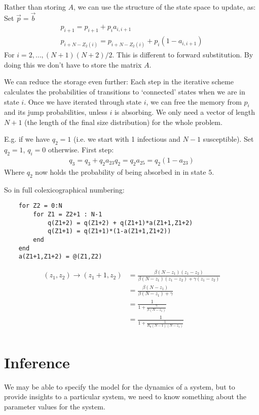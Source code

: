\documentclass{X:/Documents/Coding/Latex/myassignment}
\begin{document}
Rather than storing $A$, we can use the structure of the state space to update, as:
 Set $\vec p = \vec b$
\begin{align*}
    p_{i+1} = p_{i+1} + p_ia_{i,i+1}\\
    p_{i+N - Z_2(i)} = p_{i+N-Z_2(i)} + p_i(1-a_{i,i+1})    
\end{align*}
For $i=2,\hdots,(N+1)(N+2)/2$. This is different to forward substitution. By doing this we don't have to store the matrix $A$.

We can reduce the storage even further:
Each step in the iterative scheme calculates the probabilities of transitions to `connected' states when we are in state $i$.
Once we have iterated through state $i$, we can free the memory from $p_i$ and its jump probabilities, unless $i$ is absorbing.
We only need a vector of length $N+1$ (the length of the final size distribution) for the whole problem.

E.g. if we have $q_2 =1$ (i.e. we start with 1 infectious and $N-1$ susceptible).
Set $q_2 = 1$, $q_i = 0$ otherwise.
First step:
\begin{align*}
    q_3 = q_3 + q_2 a_{23}
    q_2 = q_2a_{25} = q_2(1-a_{23}) 
\end{align*}
Where $q_2$ now holds the probability of being absorbed in in state $5$.

So in full colexicographical numbering: 
\begin{verbatim}
    for Z2 = 0:N
        for Z1 = Z2+1 : N-1
            q(Z1+2) = q(Z1+2) + q(Z1+1)*a(Z1+1,Z1+2)
            q(Z1+1) = q(Z1+1)*(1-a(Z1+1,Z1+2))
        end
    end
    a(Z1+1,Z1+2) = @(Z1,Z2) 
\end{verbatim}
\begin{align*}
    (z_1,z_2) \to (z_1+1, z_2) &= \frac{\beta(N-z_1)(z_1-z_2)}{\beta(N-z_1)(z_1-z_2) + \gamma(z_1-z_2)}\\
    &=\frac{\beta(N-z_1)}{\beta(N-z_1) + \gamma}\\
    &=\frac{1}{1 + \frac{\gamma}{\beta(N-z_1)}}\\
    &=\frac{1}{1 + \frac{1}{R_0(N-1) (N-z_1)}}\\
\end{align*}


\section{Inference}
We may be able to specify the model for the dynamics of a system, but to provide insights to a particular system, we need to know something about the parameter values for the system.
\end{document}
